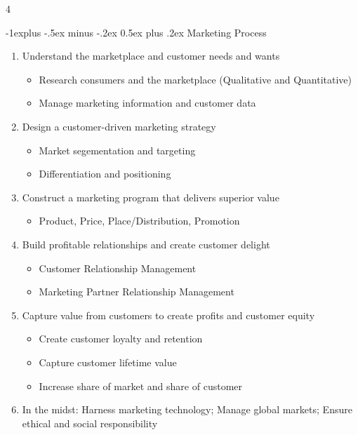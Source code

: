 \documentclass[10pt, landscape]{article}
\makeatletter
\renewcommand{\subsection}{\@startsection{subsection}{2}{0mm}%
  {-1explus -.5ex minus -.2ex}%
  {0.5ex plus .2ex}%
{\normalfont\normalsize\bfseries}}
\makeatother
\begin{document}
\begin{multicols*}{4}
\begin{itemize}
    \subsection{Marketing Process}
    \begin{enumerate}
      \item Understand the marketplace and customer needs and wants
        \begin{itemize}
          \item Research consumers and the marketplace (Qualitative and Quantitative)
          \item Manage marketing information and customer data
        \end{itemize}
      \item Design a customer-driven marketing strategy
      \begin{itemize}
        \item Market segementation and targeting
        \item Differentiation and positioning
      \end{itemize}
      \item Construct a marketing program that delivers superior value
      \begin{itemize}
        \item Product, Price, Place/Distribution, Promotion
      \end{itemize}
      \item Build profitable relationships and create customer delight
      \begin{itemize}
        \item Customer Relationship Management
        \item Marketing Partner Relationship Management
      \end{itemize}
      \item Capture value from customers to create profits and customer equity
      \begin{itemize}
        \item Create customer loyalty and retention
        \item Capture customer lifetime value
        \item Increase share of market and share of customer
      \end{itemize}
      \item In the midst: Harness marketing technology; Manage global markets; Ensure ethical and social responsibility
    \end{enumerate}


\end{itemize}
\end{multicols*}
\end{document}
